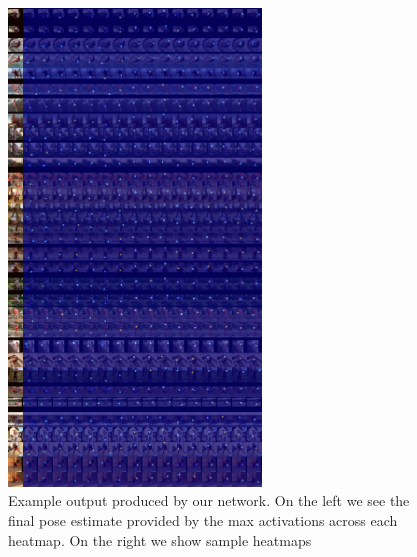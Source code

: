 \documentclass[final]{cvpr}
\begin{document}
\begin{figure}[h]
\centering
\includegraphics[width=0.6\textwidth]{val_20_hm_pred.jpg}
\caption{Example output produced by our network. On the left we see the final pose estimate provided by the max activations across each heatmap. On the right we show sample heatmaps}
\end{figure}
\end{document}
